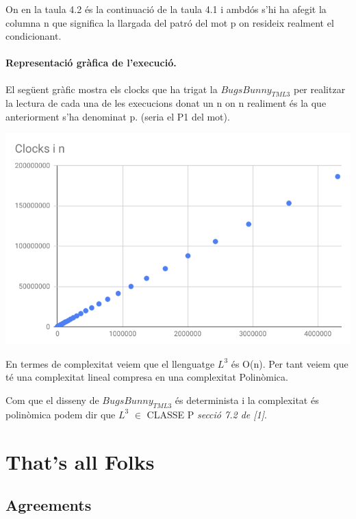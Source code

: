 \documentclass[12pt,a4paper]{report}
\def \tml3{$BugsBunny_{TML3} $}
\begin{document}
On en la taula 4.2 és la continuació de la taula 4.1 i ambdós s'hi ha afegit la columna n que significa la llargada del patró del mot p on resideix realment el condicionant.

\clearpage

\subsubsection{Representació gràfica de l'execució.}

El següent gràfic mostra els clocks que ha trigat la \tml3 per realitzar la lectura de cada una de les execucions donat un n on n realiment és la que anteriorment s'ha denominat p. (seria el P1 del mot).

\begin{center}
\includegraphics[width=16cm]{complextm}
\end{center}

En termes de complexitat veiem que el llenguatge $L^3$  és O(n). Per tant veiem que té una complexitat lineal compresa en una complexitat Polinòmica.

Com que el disseny de \tml3{} és determinista i la complexitat és polinòmica podem dir que $L^3$ $\in$ CLASSE P \textit{secció 7.2 de [1]}.

\clearpage

\chapter{That's all Folks}

\section{Agreements}
\end{document}
